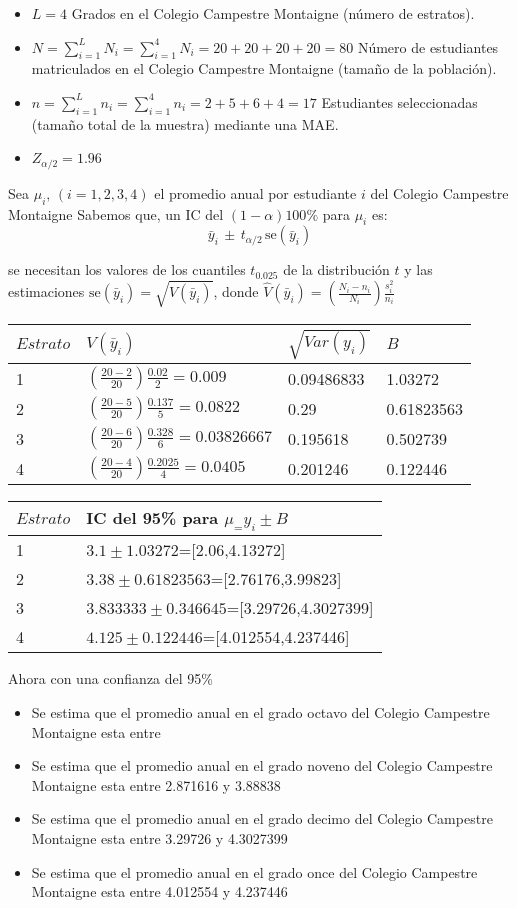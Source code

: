 \documentclass[
]{article}
\providecommand{\tightlist}{%
  \setlength{\itemsep}{0pt}\setlength{\parskip}{0pt}}
\begin{document}
\begin{itemize}
\item
  \(L = 4\) Grados en el Colegio Campestre Montaigne (número de
  estratos).
\item
  \(N = \sum_{i = 1}^L N_i = \sum_{i = 1}^4 N_i = 20 + 20 + 20 + 20 = 80\)
  Número de estudiantes matriculados en el Colegio Campestre Montaigne
  (tamaño de la población).
\item
  \(n = \sum_{i = 1}^L n_i = \sum_{i = 1}^4 n_i = 2 + 5 + 6+ 4 = 17\)
  Estudiantes seleccionadas (tamaño total de la muestra) mediante una
  MAE.
\item
  \(Z_{\alpha/2}= 1.96\)
\end{itemize}

Sea \(\mu_i,\, (i=1,2,3,4)\) el promedio anual por estudiante \(i\) del
Colegio Campestre Montaigne Sabemos que, un IC del \((1 - \alpha)100\%\)
para \(\mu_i\) es:
\[\bar{y}_i \,\pm\, t_{\alpha/2}\, \text{se}(\bar{y}_i)\]

se necesitan los valores de los cuantiles \(t_{0.025}\) de la
distribución \(t\) y las estimaciones
\(\text{se}(\bar{y}_i) = \sqrt{\widehat{V}(\bar{y}_i)}\), donde
\(\widehat{V}(\bar{y}_i) = (\frac{N_i - n_i}{N_i})\frac{s_i^2}{n_i}\)

\begin{longtable}[]{@{}llll@{}}
\toprule
\(Estrato\) & \(\widehat{V}(\bar{y}_i)\) & \(\sqrt{Var(y_i)}\) &
\(B\)\tabularnewline
\midrule
\endhead
1 & \((\frac{20 - 2}{20})\frac{0.02}{2}=0.009\) & 0.09486833 &
1.03272\tabularnewline
2 & \((\frac{20 - 5}{20})\frac{0.137}{5}=0.0822\) & 0.29 &
0.61823563\tabularnewline
3 & \((\frac{20 - 6}{20})\frac{0.328}{6}=0.03826667\) & 0.195618 &
0.502739\tabularnewline
4 & \((\frac{20 - 4}{20})\frac{0.2025}{4}=0.0405\) & 0.201246 &
0.122446\tabularnewline
\bottomrule
\end{longtable}

\begin{longtable}[]{@{}ll@{}}
\toprule
\(Estrato\) & IC del 95\% para \(\mu_=y_i\pm B\)\tabularnewline
\midrule
\endhead
1 & \(3.1\pm1.03272\)={[}2.06,4.13272{]}\tabularnewline
2 & \(3.38\pm0.61823563\)={[}2.76176,3.99823{]}\tabularnewline
3 & \(3.833333\pm0.346645\)={[}3.29726,4.3027399{]}\tabularnewline
4 & \(4.125\pm0.122446\)={[}4.012554,4.237446{]}\tabularnewline
\bottomrule
\end{longtable}

Ahora con una confianza del 95\%

\begin{itemize}
\tightlist
\item
  Se estima que el promedio anual en el grado octavo del Colegio
  Campestre Montaigne esta entre
\item
  Se estima que el promedio anual en el grado noveno del Colegio
  Campestre Montaigne esta entre 2.871616 y 3.88838
\item
  Se estima que el promedio anual en el grado decimo del Colegio
  Campestre Montaigne esta entre 3.29726 y 4.3027399
\item
  Se estima que el promedio anual en el grado once del Colegio Campestre
  Montaigne esta entre 4.012554 y 4.237446
\end{itemize}
\end{document}
